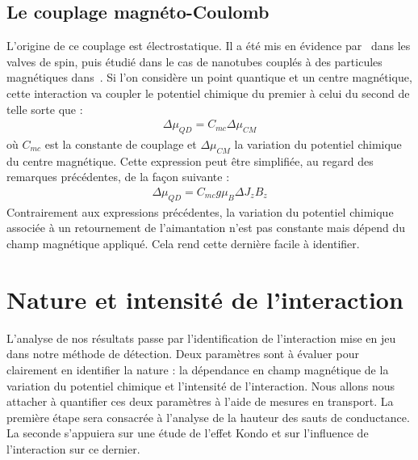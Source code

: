 \subsection{Le couplage magnéto-Coulomb}
L'origine de ce couplage est électrostatique. Il a été mis en évidence par~\cite{Molen2006} dans les valves de spin, puis étudié dans le cas de nanotubes couplés à des particules magnétiques dans~\cite{Datta2011}. Si l'on considère un point quantique et un centre magnétique, cette interaction va coupler le potentiel chimique du premier à celui du second de telle sorte que :
\begin{eqnarray}
\Delta \mu_{QD} = C_{mc} \Delta \mu_{CM}
\end{eqnarray}
où $C_{mc}$ est la constante de couplage et $\Delta \mu_{CM}$ la variation du potentiel chimique du centre magnétique. Cette expression peut être simplifiée, au regard des remarques précédentes, de la façon suivante :
\begin{eqnarray}
\Delta \mu_{QD} = C_{mc} g \mu_B  \Delta J_z B_z
\end{eqnarray}
Contrairement aux expressions précédentes, la variation du potentiel chimique associée à un retournement de l'aimantation n'est pas constante mais dépend du champ magnétique appliqué. Cela rend cette dernière facile à identifier.

\section{Nature et intensité de l'interaction}
L'analyse de nos résultats passe par l'identification de l'interaction mise en jeu dans notre méthode de détection. Deux paramètres sont à évaluer pour clairement en identifier la nature : la dépendance en champ magnétique de la variation du potentiel chimique et l'intensité de l'interaction. Nous allons nous attacher à quantifier ces deux paramètres à l'aide de mesures en transport. La première étape sera consacrée à l'analyse de la hauteur des sauts de conductance. La seconde s'appuiera sur une étude de l'effet Kondo et sur l'influence de l'interaction sur ce dernier.

